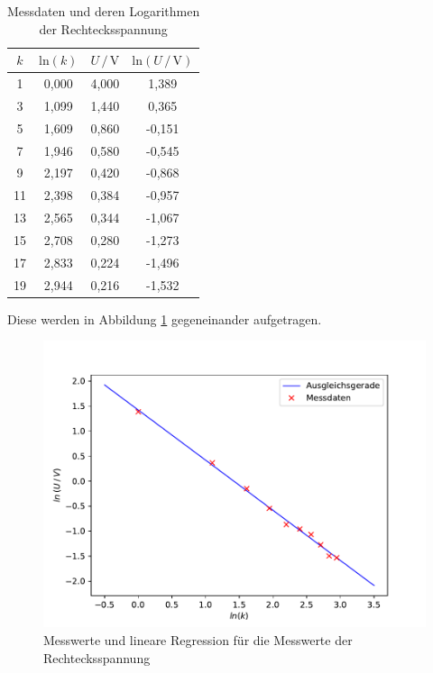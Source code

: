 \begin{table}[H]
    \centering
    \caption{Messdaten und deren Logarithmen der Rechtecksspannung}
    \label{tab:Messdaten2}
    \begin{tabular}{c c c c}
    \toprule
    $k$ & $\text{ln} (k)$ & $U \,/\, \si{\volt}$ & $\text{ln}(U \,/\, \si{\volt})$ \\
    \midrule
    1 & 0,000 & 4,000 &  1,389 \\
    3 & 1,099 & 1,440 &  0,365 \\
    5 & 1,609 & 0,860 & -0,151 \\
    7 & 1,946 & 0,580 & -0,545 \\
    9 & 2,197 & 0,420 & -0,868 \\
   11 & 2,398 & 0,384 & -0,957 \\
   13 & 2,565 & 0,344 & -1,067 \\
   15 & 2,708 & 0,280 & -1,273 \\
   17 & 2,833 & 0,224 & -1,496 \\
   19 & 2,944 & 0,216 & -1,532 \\
    \bottomrule
    \end{tabular}
\end{table} 

Diese werden in Abbildung \ref{fig:Recht} gegeneinander aufgetragen. 

\begin{figure}[H]
    \centering
    \includegraphics[scale=1.0]{content/plot2.pdf}
    \caption{Messwerte und lineare Regression für die Messwerte der Rechtecksspannung}
    \label{fig:Recht}
\end{figure}

